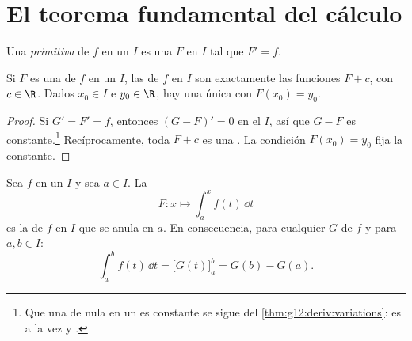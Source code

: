 \section{El teorema fundamental del cálculo}

\begin{definition}[Primitiva]\label{def:g12:integ:primitive}
Una \emph{primitiva} de $f$ en un  $I$ es una
  $F$ en $I$ tal que $F' = f$.
\end{definition}

\begin{proposition}\label{prop:g12:integ:primunique}
Si $F$ es una  de $f$ en un  $I$, las  de $f$
en $I$ son exactamente las funciones $F + c$, con $c \in \R$. Dados
$x_0 \in I$ e $y_0 \in \R$, hay una única  con $F(x_0) = y_0$.
\end{proposition}

\begin{proof}
Si $G' = F' = f$, entonces $(G - F)' = 0$ en el  $I$, así que
$G - F$ es constante.\footnote{Que una  de  nula en un
 es constante se sigue del \cref{thm:g12:deriv:variations}: es a
la vez  y .} Recíprocamente, toda $F + c$ es una
. La condición $F(x_0) = y_0$ fija la constante.
\end{proof}

\begin{theorem}\label{thm:g12:integ:ftc}
Sea $f$  en un  $I$ y sea $a \in I$. La 
\[
F \colon x \longmapsto \int_a^x f(t)\,\dd t
\]
es la  de $f$ en $I$ que se anula en $a$. En consecuencia, para
cualquier  $G$ de $f$ y para $a, b \in I$:
\[
\int_a^b f(t)\,\dd t = \bigl[G(t)\bigr]_a^b = G(b) - G(a).
\]
\end{theorem}

